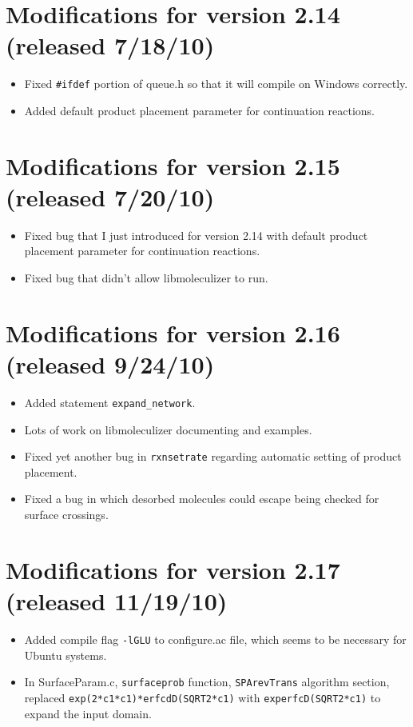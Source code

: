 \documentclass {scrbook}
\newcommand {\ttt} {\texttt}
\begin{document}
\section{Modifications for version 2.14 (released 7/18/10)}
\begin{itemize}
\item Fixed \ttt{\#ifdef} portion of queue.h so that it will compile on Windows correctly.
\item Added default product placement parameter for continuation reactions.
\end{itemize}

\section{Modifications for version 2.15 (released 7/20/10)}
\begin{itemize}
\item Fixed bug that I just introduced for version 2.14 with default product placement parameter for continuation reactions.
\item Fixed bug that didn't allow libmoleculizer to run.
\end{itemize}

\section{Modifications for version 2.16 (released 9/24/10)}
\begin{itemize}
\item Added statement \ttt{expand\_network}.
\item Lots of work on libmoleculizer documenting and examples.
\item Fixed yet another bug in \ttt{rxnsetrate} regarding automatic setting of product placement.
\item Fixed a bug in which desorbed molecules could escape being checked for surface crossings.
\end{itemize}

\section{Modifications for version 2.17 (released 11/19/10)}
\begin{itemize}
\item Added compile flag \ttt{-lGLU} to configure.ac file, which seems to be necessary for Ubuntu systems.
\item In SurfaceParam.c, \ttt{surfaceprob} function, \ttt{SPArevTrans} algorithm section, replaced \lstinline{exp(2*c1*c1)*erfcdD(SQRT2*c1)} with \lstinline{experfcD(SQRT2*c1)} to expand the input domain.
\end{itemize}
\end{document}
